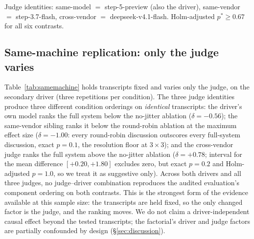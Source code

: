 \begin{table}[t]
\centering
\caption{Ablation replication, five repetitions per condition, primary
driver (mean overall $\pm$ SD). $\delta$ is Cliff's delta for full
vs.\ ablated condition under the stated judge, with exact two-sided
permutation $p$ and Holm-adjusted $p^{*}$ across the six contrasts
(3 judges $\times$ 2 ablations; post hoc family-wise control).}
\label{tab:ablation}
\small
{}

\smallskip
\noindent Judge identities: same-model $=$ step-5-preview (also the
driver), same-vendor $=$ step-3.7-flash, cross-vendor $=$
deepseek-v4.1-flash. Holm-adjusted $p^{*}\geq0.67$ for all six
contrasts.
\end{table}

\subsection{Same-machine replication: only the judge varies}

Table~\ref{tab:samemachine} holds transcripts fixed and varies only the
judge, on the secondary driver (three repetitions per condition). The
three judge identities produce three different condition orderings on
\emph{identical} transcripts: the driver's own model ranks the full
system below the no-jitter ablation ($\delta=-0.56$); the same-vendor
sibling ranks it below the round-robin ablation at the maximum effect
size ($\delta=-1.00$: every round-robin discussion outscores every
full-system discussion, exact $p=0.1$, the resolution floor at $3\times3$);
and the cross-vendor judge ranks the full system above the no-jitter
ablation ($\delta=+0.78$; interval for the mean difference
$[+0.20,+1.80]$ excludes zero, but exact $p=0.2$ and Holm-adjusted
$p=1.0$, so we treat it as suggestive only). Across both drivers and
all three judges, no judge--driver combination reproduces the audited
evaluation's component ordering on both contrasts. This is the
strongest form of the evidence available at this sample size: the
transcripts are held fixed, so the only changed factor is the judge,
and the ranking moves. We do not claim a driver-independent causal
effect beyond the tested transcripts; the factorial's driver and judge
factors are partially confounded by design (\S\ref{sec:discussion}).

